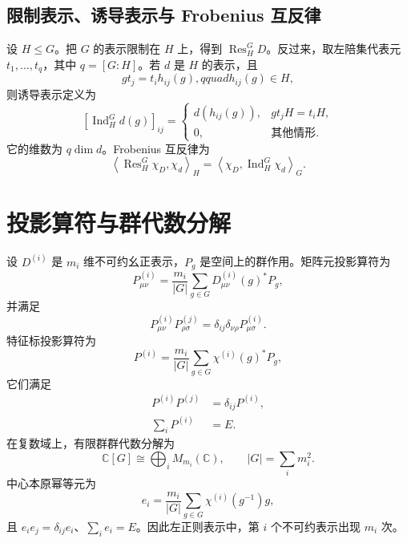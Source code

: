 \subsection{限制表示、诱导表示与 Frobenius 互反律}
设 $H\leq G$。把 $G$ 的表示限制在 $H$ 上，得到 $\operatorname{Res}^G_H D$。反过来，取左陪集代表元 $t_1,\ldots,t_q$，其中 $q=\left[G:H\right]$。若 $d$ 是 $H$ 的表示，且
\begin{equation}
g t_j=t_i h_{ij}\left(g\right),qquad h_{ij}\left(g\right)\in H,
\end{equation}
则诱导表示定义为
\begin{equation}
\left[\operatorname{Ind}_H^G d\left(g\right)\right]_{ij}=
\begin{cases}d\left(h_{ij}\left(g\right)\right),&g t_jH=t_iH,\\0,&\text{其他情形}.
\end{cases}
\end{equation}
它的维数为 $q\dim d$。Frobenius 互反律为
\begin{equation}
\left\langle \operatorname{Res}^G_H\chi_D,\chi_d\right\rangle_H
=\left\langle \chi_D,\operatorname{Ind}_H^G\chi_d\right\rangle_G.
\end{equation}

\section{投影算符与群代数分解}
设 $D^{\left(i\right)}$ 是 $m_i$ 维不可约幺正表示，$P_g$ 是空间上的群作用。矩阵元投影算符为
\begin{equation}
P^{\left(i\right)}_{\mu\nu}=\frac{m_i}{\left|G\right|}\sum_{g\in G}D^{\left(i\right)}_{\mu\nu}\left(g\right)^*P_g,
\end{equation}
并满足
\begin{equation}
P^{\left(i\right)}_{\mu\nu}P^{\left(j\right)}_{\rho\sigma}
=\delta_{ij}\delta_{\nu\rho}P^{\left(i\right)}_{\mu\sigma}.
\end{equation}
特征标投影算符为
\begin{equation}
P^{\left(i\right)}=\frac{m_i}{\left|G\right|}\sum_{g\in G}\chi^{\left(i\right)}\left(g\right)^*P_g,
\end{equation}
它们满足
\begin{align}
P^{\left(i\right)}P^{\left(j\right)}&=\delta_{ij}P^{\left(i\right)},\\
\sum_iP^{\left(i\right)}&=E.
\end{align}
在复数域上，有限群群代数分解为
\begin{equation}
\mathbb{C}\left[G\right]\cong\bigoplus_i M_{m_i}\left(\mathbb{C}\right),
\qquad \left|G\right|=\sum_i m_i^2.
\end{equation}
中心本原幂等元为
\begin{equation}
e_i=\frac{m_i}{\left|G\right|}\sum_{g\in G}\chi^{\left(i\right)}\left(g^{-1}\right)g,
\end{equation}
且 $e_ie_j=\delta_{ij}e_i$、$\sum_i e_i=E$。因此左正则表示中，第 $i$ 个不可约表示出现 $m_i$ 次。


